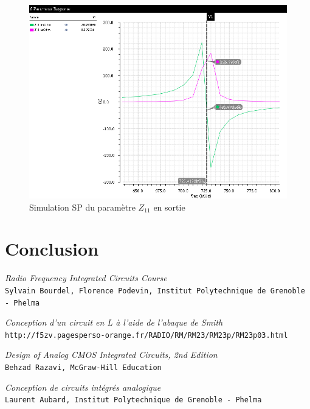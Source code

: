 \documentclass[a4paper]{article}
\begin{document}
\begin{figure}[!htb]
\begin{center}
  \includegraphics[scale=0.40]{sim-input-impedance.png}
  \caption{Simulation SP du param\`etre $Z_{11}$ en sortie}
\end{center}
\end{figure}

\clearpage

\section*{Conclusion}


\begin{thebibliography}{9}

\textit{Radio Frequency Integrated Circuits Course}\\
\texttt{Sylvain Bourdel, Florence Podevin, Institut Polytechnique de Grenoble - Phelma}

\textit{Conception d'un circuit en L \`a l'aide de l'abaque de Smith}\\
\texttt{http://f5zv.pagesperso-orange.fr/RADIO/RM/RM23/RM23p/RM23p03.html}

\textit{Design of Analog CMOS Integrated Circuits, 2nd Edition}\\
\texttt{Behzad Razavi, McGraw-Hill Education}

\textit{Conception de circuits int\'egr\'es analogique}\\
\texttt{Laurent Aubard, Institut Polytechnique de Grenoble - Phelma}

\end{thebibliography}
\end{document}
